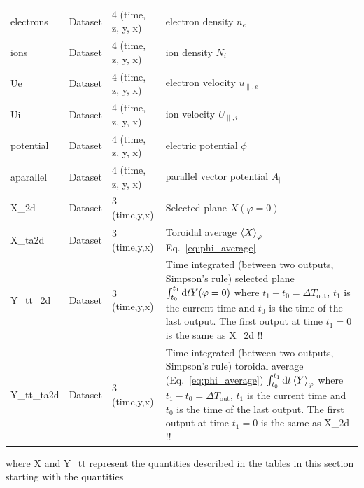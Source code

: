 \begin{longtable}{lll>{\RaggedRight}p{7cm}}
electrons        & Dataset & 4 (time, z, y, x) & electron density $n_e$ \\
ions             & Dataset & 4 (time, z, y, x) & ion density $N_i$ \\
Ue               & Dataset & 4 (time, z, y, x) & electron velocity $u_{\parallel,e}$ \\
Ui               & Dataset & 4 (time, z, y, x) & ion velocity $U_{\parallel,i}$ \\
potential        & Dataset & 4 (time, z, y, x) & electric potential $\phi$ \\
aparallel        & Dataset & 4 (time, z, y, x) & parallel vector potential $A_\parallel$ \\
X\_2d            & Dataset & 3 (time,y,x) & Selected plane $X(\varphi=0)$ \\
X\_ta2d          & Dataset & 3 (time,y,x) & Toroidal average $\left \langle  X  \right\rangle_\varphi$
Eq.~\eqref{eq:phi_average} \\
Y\_tt\_2d        & Dataset & 3 (time,y,x) & Time integrated (between two outputs, Simpson's rule) selected plane
$\int_{t_0}^{t_1}\mathrm{d} t Y(\varphi=0) $
where $t_1 - t_0 = \Delta T_{\text{out}}$, $t_1$ is the current time and $t_0$ is the time of the last output. \color{red} The first output at time $t_1=0$ is the same as X\_2d !!\color{black} \\
Y\_tt\_ta2d      & Dataset & 3 (time,y,x) & Time integrated (between two outputs, Simpson's rule) toroidal average (Eq.~\eqref{eq:phi_average})
$\int_{t_0}^{t_1}\mathrm{d} t \left \langle  Y  \right\rangle_\varphi$
where $t_1 - t_0 = \Delta T_{\text{out}}$, $t_1$ is the current time and $t_0$ is the time of the last output. \color{red} The first output at time $t_1 = 0$ is the same as X\_2d !!\color{black} \\
\bottomrule
\end{longtable}
where
X and Y\_tt represent the quantities described in the tables in this section starting with the quantities
